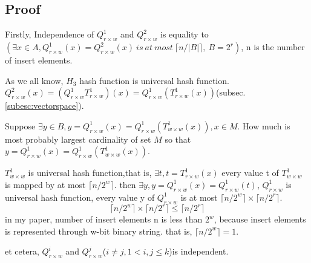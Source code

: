 \documentclass[10.5pt,onecolumn,twoside]{article}
\begin{document}
\begin{CJK*}{UTF8}{song}
\subsection{Proof}

Firstly, Independence of $Q^1_{r\times w}$ and $Q^2_{r\times w}$ is equality to $(\exists x \in A, Q^1_{r\times w}(x) = Q^2_{r\times w}(x)\ is\ at\ most\ \lceil n/|B|\rceil,\ B=2^r)$, n is the number of insert elements.

 As we all know, $H_3$ hash function is universal hash function. $Q^2_{r\times w}(x)=(Q^1_{r\times w}T^1_{r\times w})(x)=Q^1_{r\times w}(T^1_{r\times w}(x))$(subsec.\ref{subesc:vectorspace}).

  Suppose $\exists y\in B, y=Q^1_{r\times w}(x)=Q^1_{r\times w}(T^1_{w\times w}(x)),x\in M$. How much is most probably largest cardinality of set $M$ so that $y=Q^1_{r\times w}(x)=Q^1_{r\times w}(T^1_{w\times w}(x))$.

  $T^1_{w\times w}$ is universal hash function,that is, $\exists t,t=T^1_{r\times w}(x)$ every value t of $T^1_{w\times w}$ is mapped by at most  $\lceil n/2^w\rceil$. then  $\exists y,y=Q^1_{r\times w}(x)=Q^1_{r\times w}(t)$, $Q^1_{r\times w}$ is universal hash function, every value y of $Q^1_{r\times w}$ is at most $\lceil n/2^w\rceil \times \lceil n/2^r\rceil$.
\begin{equation}\label{proof:independent}
  \lceil n/2^w\rceil \times \lceil n/2^r\rceil \leq \lceil n/2^r\rceil
\end{equation}
in my paper, number of insert elements n is less than $2^w$, because insert elements is represented through w-bit binary string. that is, $\lceil n/2^w \rceil=1$.

et cetera, $Q^i_{r\times w}$ and $Q^j_{r\times w}$($i\neq j, 1<i,j\leq k$)is independent.






\end{CJK*}
\end{document}
